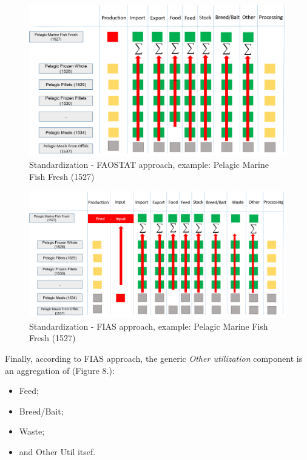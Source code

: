 \documentclass[nojss]{jss}
\begin{document}
\begin{center}
\begin{figure}
\includegraphics{flow-charts/standardization/FAOSTAT_standardization.png}
\caption{Standardization - FAOSTAT approach, example: Pelagic Marine Fish Fresh  (1527)}
\end{figure}
\end{center}


\begin{center}
\begin{figure}
\includegraphics{flow-charts/standardization/FIAS_standardization.png}
\caption{Standardization - FIAS approach, example: Pelagic Marine Fish Fresh  (1527)}
\end{figure}
\end{center}


Finally, according to FIAS approach, the generic \textit{Other utilization} component is an aggregation of (Figure 8.):

\begin{itemize}
\item Feed;
\item Breed/Bait;
\item Waste;
\item and Other Util itsef.
\end{itemize}
\end{document}
